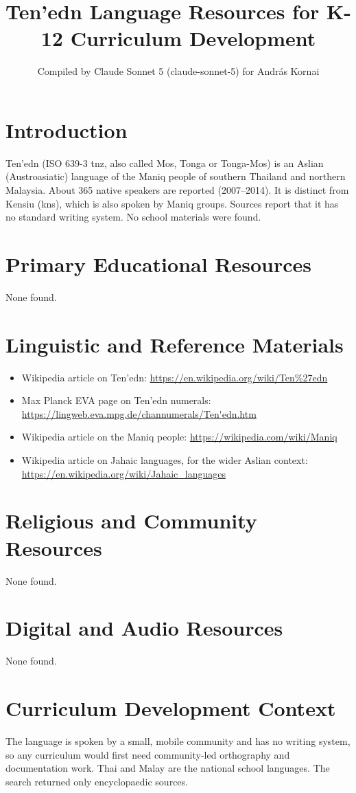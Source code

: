 \documentclass[12pt]{article}
\title{Ten'edn Language Resources for K-12 Curriculum Development}
\author{Compiled by Claude Sonnet 5 (claude-sonnet-5) for Andr\'as Kornai}
\date{}
\begin{document}
\maketitle

\section{Introduction}
Ten'edn (ISO 639-3 tnz, also called Mos, Tonga or Tonga-Mos) is an Aslian (Austroasiatic) language of the Maniq people of southern Thailand and northern Malaysia. About 365 native speakers are reported (2007--2014). It is distinct from Kensiu (kns), which is also spoken by Maniq groups. Sources report that it has no standard writing system. No school materials were found.

\section{Primary Educational Resources}
None found.

\section{Linguistic and Reference Materials}
\begin{itemize}
\item Wikipedia article on Ten'edn: \url{https://en.wikipedia.org/wiki/Ten%27edn}
\item Max Planck EVA page on Ten'edn numerals: \url{https://lingweb.eva.mpg.de/channumerals/Ten'edn.htm}
\item Wikipedia article on the Maniq people: \url{https://wikipedia.com/wiki/Maniq}
\item Wikipedia article on Jahaic languages, for the wider Aslian context: \url{https://en.wikipedia.org/wiki/Jahaic_languages}
\end{itemize}

\section{Religious and Community Resources}
None found.

\section{Digital and Audio Resources}
None found.

\section{Curriculum Development Context}
The language is spoken by a small, mobile community and has no writing system, so any curriculum would first need community-led orthography and documentation work. Thai and Malay are the national school languages. The search returned only encyclopaedic sources.
\end{document}
